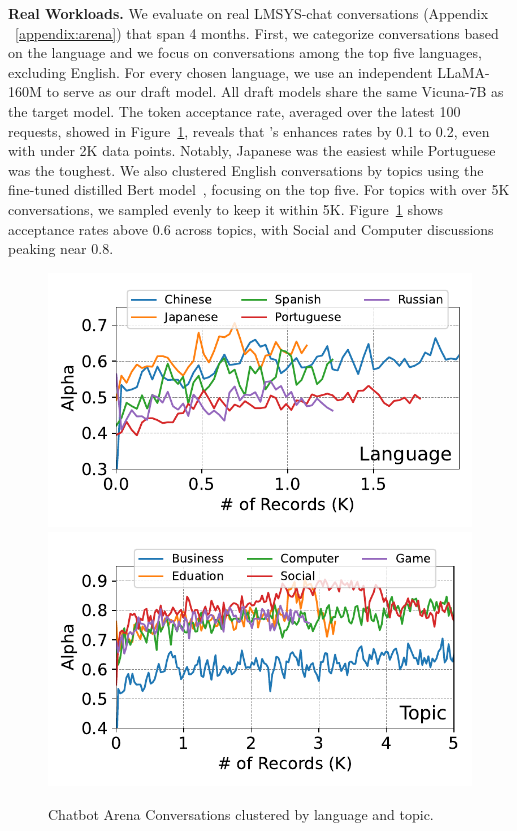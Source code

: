 
{\bf Real Workloads.} We evaluate \tool on real LMSYS-chat conversations (Appendix ~\ref{appendix:arena}) that span 4 months.
First, we categorize conversations based on the language and we focus on conversations among the top five languages, excluding English. For every chosen language, we use an independent LLaMA-160M to serve as our draft model. All draft models share the same Vicuna-7B as the target model. The token acceptance rate, averaged over the latest 100 requests, showed in Figure~\ref{fig:arena}, reveals that \tool's enhances rates by 0.1 to 0.2, even with under 2K data points. Notably, Japanese was the easiest while Portuguese was the toughest.
We also clustered English conversations by topics using the fine-tuned distilled Bert model~\citep{distill-bert-topic}, focusing on the top five. For topics with over 5K conversations, we sampled evenly to keep it within 5K. Figure~\ref{fig:arena} shows acceptance rates above 0.6 across topics, with Social and Computer discussions peaking near 0.8.
\begin{figure}
    \vspace{-10pt}
    \centering
    \includegraphics[width=0.4\linewidth]{figures/arena_language.pdf}
    \includegraphics[width=0.4\linewidth]{figures/arena_class.pdf}
    \vspace{-10pt}
    \caption{Chatbot Arena Conversations clustered by language and topic.}
    \label{fig:arena}
\end{figure}

